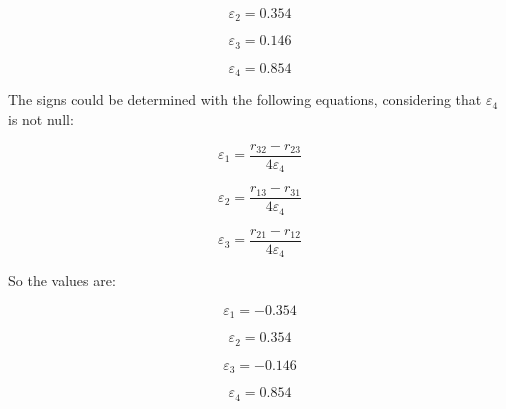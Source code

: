 \documentclass{exam}
\begin{document}
\begin{questions}
\begin{parts}
\begin{equation}
  \varepsilon_{2} = 0.354
\end{equation}

\begin{equation}
  \varepsilon_{3} = 0.146
\end{equation}

\begin{equation}
  \varepsilon_{4} = 0.854
\end{equation}

The signs could be determined with the following equations, considering that $\varepsilon_{4}$ is not null:

\begin{equation}
  \varepsilon_{1} = \frac{r_{32} - r_{23}}{4\varepsilon_{4}}
\end{equation}

\begin{equation}
  \varepsilon_{2} = \frac{r_{13} - r_{31}}{4\varepsilon_{4}}
\end{equation}

\begin{equation}
  \varepsilon_{3} = \frac{r_{21} - r_{12}}{4\varepsilon_{4}}
\end{equation}

So the values are:

\begin{equation}
  \varepsilon_{1} = -0.354
\end{equation}

\begin{equation}
  \varepsilon_{2} = 0.354
\end{equation}

\begin{equation}
  \varepsilon_{3} = -0.146
\end{equation}

\begin{equation}
  \varepsilon_{4} = 0.854
\end{equation}

\end{parts}

\end{questions}
\end{document}
